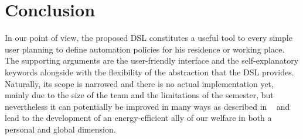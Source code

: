 \documentclass{llncs}
\begin{document}
\section{Conclusion}\label{sec:conclusion}
In our point of view, the proposed DSL constitutes a useful tool to every simple user planning to define automation policies for his residence or working place. The supporting arguments are the user-friendly interface and the self-explanatory keywords alongside with the flexibility of the abstraction that the DSL provides. Naturally, its scope is narrowed and there is no actual implementation yet, mainly due to the size of the team and the limitations of the semester, but nevertheless it can potentially be improved in many ways as described in ~ and lead to the development of an energy-efficient ally of our welfare in both a personal and global dimension. 

{}




\end{document}

